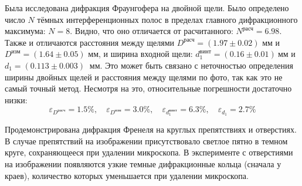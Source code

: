 \documentclass[a4paper,11pt]{extarticle} %
\begin{document}
Была исследована дифракция Фраунгофера на двойной щели. Было определено число $N$ тёмных интерференционных полос в пределах главного дифракционного максимума: $N = 8$. Видно, что оно отличается от расчитанного: $N^{\text{расч}} = 6.98$. Также и отличаются расстояния между щелями $D^{\text{расч}} = (1.97 \pm 0.02 ) \text{ мм} $ и $D^{\text{изм}} = (1.64 \pm 0.05) \text{ мм} $, и ширина входной щели: $d_1^{\text{винт}} = (0.16 \pm 0.01) ~\text{мм}$ и $d_1 = (0.113 \pm 0.003) ~\text{ мм} $. Это может быть связано с неточностью определения ширины двойных щелей и расстояния между щелями по фото, так как это не самый точный метод. Несмотря на это, относительные погрешности достаточно низки: $$\varepsilon_{D^{\text{расч}}} = 1.5\%, \quad 
\varepsilon_{D^{\text{изм}}} = 3.0\%, \quad 
\varepsilon_{d_1^{\text{винт}}} = 6.3\%, \quad 
\varepsilon_{d_1} = 2.7\% $$

Продемонстрирована дифракция Френеля на круглых препятствиях и отверстиях. В случае препятствий на изображении присутствовало светлое пятно в темном круге, сохраняющееся при удалении микроскопа. В эксперименте с отверстиями на изображении появляются узкие темные дифракционные кольца (сначала у краев), количество которых уменьшается при удалении микроскопа.
\end{document}
